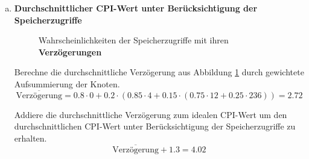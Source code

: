 \begin{enumerate}[a)]
	\item \textbf{Durchschnittlicher CPI-Wert unter Berücksichtigung der Speicherzugriffe}
	\begin{figure}[h!]
		\centering
		\caption{Wahrscheinlichkeiten der Speicherzugriffe mit ihren \textbf{Verzögerungen}}
		\label{fig:prob1}
	\end{figure}

	Berechne die durchschnittliche Verzögerung aus Abbildung \ref{fig:prob1} durch gewichtete Aufsummierung der Knoten.
	\begin{equation*}
		\overline{\text{Verzögerung}} = 0.8 \cdot 0 + 0.2 \cdot (0.85 \cdot 4 + 0.15 \cdot(0.75 \cdot 12 + 0.25 \cdot 236)) = 2.72
	\end{equation*}
	
	Addiere die durchschnittliche Verzögerung zum idealen CPI-Wert um den durchschnittlichen CPI-Wert unter Berücksichtigung der Speicherzugriffe zu erhalten.
	\begin{equation*}
		\overline{\text{Verzögerung}} + 1.3 = 4.02
	\end{equation*}
\end{enumerate}